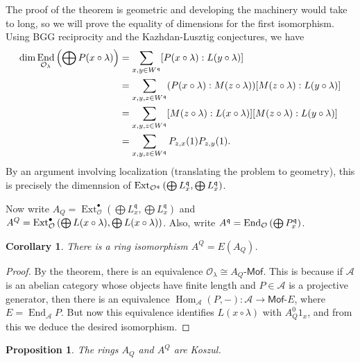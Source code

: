 \documentclass[leqno, openany]{memoir}
\newtheorem{cor}[thm]{Corollary}
\newtheorem{prop}[thm]{Proposition}
\theoremstyle{definition}
\theoremstyle{remark}
\theoremstyle{plain}
\theoremstyle{definition}
\theoremstyle{remark}
\newcommand{\cO}{\mathcal{O}}
\newcommand{\mc}[1]{\mathcal{#1}}
\newcommand{\mf}[1]{\mathfrak{#1}}
\newcommand{\ms}[1]{\mathsf{#1}}
\DeclareMathOperator{\Hom}{Hom}
\DeclareMathOperator{\End}{End}
\DeclareMathOperator{\Ext}{Ext}
\begin{document}
The proof of the theorem is geometric and developing the machinery would take to long, so we will prove the equality of dimensions for the first isomorphism. Using BGG reciprocity and the Kazhdan-Lusztig conjectures, we have
\begin{align*}
    \dim \End_{\cO_{\lambda}}\qty(\bigoplus P(x \circ \lambda)) &= \sum_{x, y \in W^{\mf{q}}} [P(x \circ \lambda) : L(y \circ \lambda)] \\
    &= \sum_{x, y, z \in W^{\mf{q}}} (P(x \circ \lambda) : M(z \circ \lambda)) [M(z \circ \lambda) : L(y \circ \lambda)] \\
    &= \sum_{x,y,z \in W^{\mf{q}}} [M(z \circ \lambda):L(x \circ \lambda)][M(z \circ \lambda) : L(y \circ \lambda)] \\
    &= \sum_{x,y,z \in W^{\mf{q}}} P_{z,x}(1)P_{z,y}(1).
\end{align*}
By an argument involving localization (translating the problem to geometry), this is precisely the dimennsion of $\Ext_{\cO^{\mf{q}}}\qty(\bigoplus L_x^{\mf{q}}, \bigoplus L_x^{\mf{q}})$.

Now write $A_{Q} = \Ext_{\cO}^{\bullet}(\bigoplus L_x^{\mf{q}}, \bigoplus L_x^{\mf{q}})$ and $A^{Q} = \Ext_{\cO}^{\bullet}\qty(\bigoplus L(x \circ \lambda), \bigoplus L(x \circ \lambda))$. Also, write $A^{\mf{q}} = \End_{\cO}\qty(\bigoplus P_x^{\mf{q}})$.
\begin{cor}
    There is a ring isomorphism $A^{Q} = E(A_{Q})$.
\end{cor}

\begin{proof}
    By the theorem, there is an equivalence $\cO_{\lambda} \cong A_{Q}\text{-}\ms{Mof}$. This is because if $\mc{A}$ is an abelian category whose objects have finite length and $P \in \mc{A}$ is a projective generator, then there is an equivalence $\Hom_{\mc{A}}(P,-) \colon \mc{A} \to \ms{Mof}\text{-}E$, where $E = \End_{\mc{A}} P$. But now this equivalence identifies $L(x \circ \lambda)$ with $A_{Q}^0 1_x$, and from this we deduce the desired isomorphism.
\end{proof}

\begin{prop}
    The rings $A_{Q}$ and $A^{Q}$ are Koszul.
\end{prop}
\end{document}

